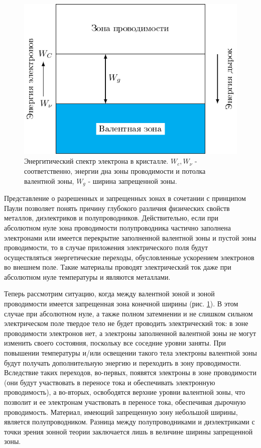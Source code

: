 \begin{figure}
	\includegraphics[width = \linewidth]{img/cond.pdf}
	\caption{Энергитический спектр электрона в кристалле. $W_c,W_{\nu}$ - соответственно, энергии дна зоны проводимости и потолка валентной зоны, $W_g$ - ширина запрещенной зоны.}
	\label{fig:cond}
\end{figure}

Представление о разрешенных и запрещенных зонах в сочетании с принципом Паули позволяет понять причину глубокого
различия физических свойств металлов, диэлектриков и полупроводников. Действительно, если при абсолютном нуле зона
проводимости полупроводника частично заполнена электронами или имеется перекрытие заполненной валентной зоны и пустой
зоны проводимости, то в случае приложения электрического поля будут осуществляться энергетические переходы,
обусловленные ускорением электронов во внешнем поле. Такие материалы проводят электрический ток даже при абсолютном нуле
температуры и являются металлами.  
 
Теперь рассмотрим ситуацию, когда между валентной зоной и зоной проводимости имеется запрещенная зона конечной ширины
(рис. \ref{fig:cond}). В этом случае при абсолютном нуле, а также полном затемнении и не слишком сильном электрическом поле твердое
тело не будет проводить электрический ток: в зоне проводимости электронов нет, а электроны заполненной валентной зоны не
могут изменить своего состояния, поскольку все соседние уровни заняты. При повышении температуры и/или освещении такого
тела электроны валентной зоны будут получать дополнительную энергию и переходить в зону проводимости. Вследствие таких
переходов, во-первых, появятся электроны в зоне проводимости (они будут участвовать в переносе тока и обеспечивать
электронную проводимость), а во-вторых, освободятся верхние уровни валентной зоны, что позволит и ее электронам
участвовать в переносе тока, обеспечивая дырочную проводимость. Материал, имеющий запрещенную зону небольшой ширины,
является полупроводником. Разница между полупроводниками и диэлектриками с точки зрения зонной теории заключается лишь в
величине ширины запрещенной зоны.

